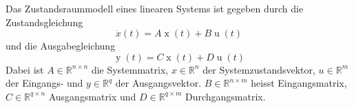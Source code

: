 Das Zustandsraummodell eines linearen Systems ist gegeben durch die Zustandsgleichung	
$$\dot{x}(t) = A \operatorname{x}(t) + B \operatorname{u}(t)$$
und die Ausgabegleichung
$$\operatorname{y}(t) = C \operatorname{x}(t) + D \operatorname{u}(t)$$
Dabei ist $A \in \mathbb{R}^{n \times n}$ die Systemmatrix, $x \in \mathbb{R}^{n}$ der Systemzustandsvektor, $u \in \mathbb{R}^{m}$ der Eingangs- und $y \in \mathbb{R}^{q}$ der Ausgangsvektor. 
$B \in \mathbb{R}^{n \times m}$ heisst Eingangsmatrix, $C \in \mathbb{R}^{q \times n}$ Ausgangsmatrix und $D \in \mathbb{R}^{q \times m}$ Durchgangsmatrix.
